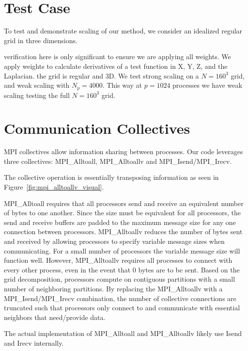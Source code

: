 \documentclass{report}
\begin{document}
\section{Test Case}

To test and demonstrate scaling of our method, we consider an idealized regular grid in three dimensions. 

verification here is only significant to ensure we are applying all weights. 
We apply weights to calculate derivatives of a test function in X, Y, Z, and the Laplacian. 
the grid is regular and 3D.
We test strong scaling on a $N=160^3$ grid, and weak scaling with $N_p=4000$. This way at $p=1024$ processes we have weak scaling testing the full $N=160^3$ grid. 





\section{Communication Collectives} 

MPI collectives allow information sharing between processes. Our code leverages three collectives: MPI\_Alltoall, MPI\_Alltoallv and MPI\_Isend/MPI\_Irecv. 

The collective operation is essentially transposing information as seen in Figure~\ref{fig:mpi_alltoallv_visual}. 

MPI\_Alltoall requires that all processors send and receive an equivalent number of bytes to one another. Since the size must be equivalent for all processors, the send and receive buffers are padded to the maximum message size for any one connection between processors. MPI\_Alltoallv reduces the number of bytes sent and received by allowing processors to specify variable message sizes when communicating. For a small number of processors the variable message size will function well. However, MPI\_Alltoallv requires all processes to connect with every other process, even in the event that 0 bytes are to be sent. Based on the grid decomposition, processors compute on contiguous partitions with a small number of neighboring partitions. By replacing the MPI\_Alltoallv with a MPI\_Isend/MPI\_Irecv combination, the number of collective connections are truncated such that processors only connect to and communicate with essential neighbors that need/provide data. 

The actual implementation of MPI\_Alltoall and MPI\_Alltoallv likely use Isend and Irecv internally. 
\end{document}
